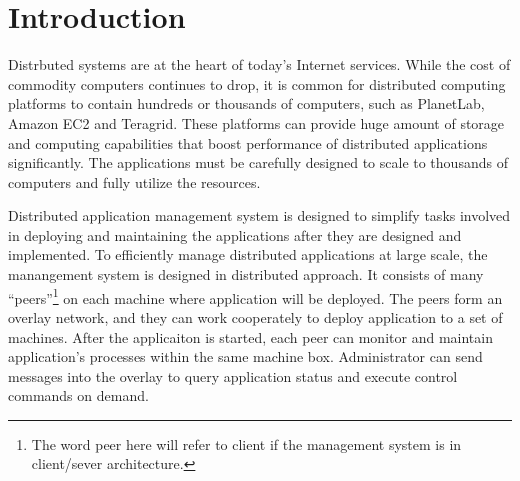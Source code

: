 \section{Introduction}

Distrbuted systems are at the heart of today's Internet
services. While the cost of commodity computers continues to
drop, it is common for distributed computing platforms to
contain hundreds or thousands of computers, such as
PlanetLab, Amazon EC2 and Teragrid. These platforms can
provide huge amount of storage and computing capabilities
that boost performance of distributed applications
significantly. The applications must be carefully designed
to scale to thousands of computers and fully utilize the
resources.

Distributed application management system is designed to
simplify tasks involved in deploying and maintaining the
applications after they are designed and implemented. To
efficiently manage distributed applications at large scale,
the manangement system is designed in distributed approach.
It consists of many ``peers''\footnote{The word peer here
will refer to client if the management system is in
client/sever architecture.} on each machine where
application will be deployed. The peers form an overlay
network, and they can work cooperately to deploy application to
a set of machines.  After the applicaiton is started, each
peer can monitor and maintain application's processes within
the same machine box.  Administrator can send messages into
the overlay to query application status and execute control
commands on demand.

